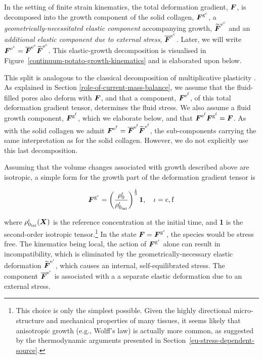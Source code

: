 In the setting of finite strain kinematics, the total deformation
gradient, $\mbox{\boldmath$ F$}$, is decomposed into the growth component of the solid
collagen, $\mbox{\boldmath$ F$}^{\mathrm{g}^\mathrm{c}}$, a
\emph{geometrically-necessitated elastic component} accompanying
growth, $\widetilde{\mbox{\boldmath$ F$}}^{\mathrm{e}^\mathrm{c}}$ and an
\emph{additional elastic component due to external stress},
$\overline{\mbox{\boldmath$ F$}}^{\mathrm{e}^\mathrm{c}}$. Later, we will write
$\mbox{\boldmath$ F$}^{\mathrm{e}^\mathrm{c}} = \overline{\mbox{\boldmath$ F$}}^{\mathrm{e}^\mathrm{c}}
\widetilde{\mbox{\boldmath$ F$}}^{\mathrm{e}^\mathrm{c}}$. This elastic-growth
decomposition is visualised in
Figure~\ref{continuum-potato-growth-kinematics} and is elaborated upon
below.

This split is analogous to the classical decomposition of
multiplicative plasticity \citep{Bilbyetal:1956,Lee:1969}. As
explained in Section \ref{role-of-current-mass-balance}, we assume
that the fluid-filled pores also deform with $\mbox{\boldmath$ F$}$, and that a
component, $\mbox{\boldmath$ F$}^{\mathrm{e}^\mathrm{f}}$, of this total deformation
gradient tensor, determines the fluid stress. We also assume a fluid
growth component, $\mbox{\boldmath$ F$}^{\mathrm{g}^\mathrm{f}}$, which we elaborate
below, and that
$\mbox{\boldmath$ F$}^{\mathrm{e}^\mathrm{f}}\mbox{\boldmath$ F$}^{\mathrm{g}^\mathrm{f}} = \mbox{\boldmath$ F$}$. As
with the solid collagen we admit $\mbox{\boldmath$ F$}^{\mathrm{e}^\mathrm{f}} =
\overline{\mbox{\boldmath$ F$}}^{\mathrm{e}^\mathrm{f}}
\widetilde{\mbox{\boldmath$ F$}}^{\mathrm{e}^\mathrm{f}}$, the sub-components carrying
the same interpretation as for the solid collagen. However, we do not
explicitly use this last decomposition.

Assuming that the volume changes associated with growth described
above are isotropic, a simple form for the growth part of the
deformation gradient tensor is

\begin{equation}
\mbox{\boldmath$ F$}^{\mathrm{g}^\iota} = \left(
  \frac{\rho_0^\iota}{\rho_{0_{\mathrm{ini}}}^\iota} \right)^
  {\frac{1}{3}} 
{\bf 1},\quad \iota = \mathrm{c,f}
\label{isotropicgrowth} 
\end{equation} 

\noindent where $\rho_{0_{\mathrm{ini}}}^\iota(\mbox{\boldmath$ X$})$ is the reference
concentration at the initial time, and {\bf 1} is the second-order
isotropic tensor.\footnote{This choice is only the simplest
  possible. Given the highly directional micro-structure and
  mechanical properties of many tissues, it seems likely that
  anisotropic growth (e.g., Wolff's law) is actually more common, as
  suggested by the thermodynamic arguments presented in
  Section~\ref{eu-stress-dependent-source}.} In the state $\mbox{\boldmath$ F$} =
\mbox{\boldmath$ F$}^{\mathrm{g}^\iota}$, the species would be stress free. The
kinematics being local, the action of $\mbox{\boldmath$ F$}^{\mathrm{g}^\iota}$ alone
can result in incompatibility, which is eliminated by the
geometrically-necessary elastic deformation
$\widetilde{\mbox{\boldmath$ F$}}^{\mathrm{e}^{\mathrm{\iota}}}$, which causes an
internal, self-equilibrated stress. The component
$\overline{\mbox{\boldmath$ F$}}^{\mathrm{e}^\iota}$ is associated with a a separate
elastic deformation due to an external stress.

